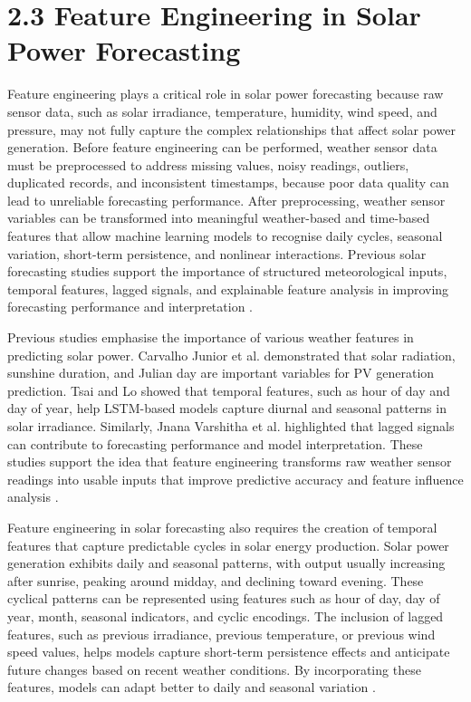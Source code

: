 \section{2.3 Feature Engineering in Solar Power Forecasting}

Feature engineering plays a critical role in solar power forecasting because raw sensor data, such as solar irradiance, temperature, humidity, wind speed, and pressure, may not fully capture the complex relationships that affect solar power generation. Before feature engineering can be performed, weather sensor data must be preprocessed to address missing values, noisy readings, outliers, duplicated records, and inconsistent timestamps, because poor data quality can lead to unreliable forecasting performance. After preprocessing, weather sensor variables can be transformed into meaningful weather-based and time-based features that allow machine learning models to recognise daily cycles, seasonal variation, short-term persistence, and nonlinear interactions. Previous solar forecasting studies support the importance of structured meteorological inputs, temporal features, lagged signals, and explainable feature analysis in improving forecasting performance and interpretation \parencite{TsaiLo2025, JnanaVarshitha2025, Duvuru2026}.

Previous studies emphasise the importance of various weather features in predicting solar power. Carvalho Junior et al. demonstrated that solar radiation, sunshine duration, and Julian day are important variables for PV generation prediction. Tsai and Lo showed that temporal features, such as hour of day and day of year, help LSTM-based models capture diurnal and seasonal patterns in solar irradiance. Similarly, Jnana Varshitha et al. highlighted that lagged signals can contribute to forecasting performance and model interpretation. These studies support the idea that feature engineering transforms raw weather sensor readings into usable inputs that improve predictive accuracy and feature influence analysis \parencite{CarvalhoJunior2025, TsaiLo2025, JnanaVarshitha2025}.

Feature engineering in solar forecasting also requires the creation of temporal features that capture predictable cycles in solar energy production. Solar power generation exhibits daily and seasonal patterns, with output usually increasing after sunrise, peaking around midday, and declining toward evening. These cyclical patterns can be represented using features such as hour of day, day of year, month, seasonal indicators, and cyclic encodings. The inclusion of lagged features, such as previous irradiance, previous temperature, or previous wind speed values, helps models capture short-term persistence effects and anticipate future changes based on recent weather conditions. By incorporating these features, models can adapt better to daily and seasonal variation \parencite{TsaiLo2025, JnanaVarshitha2025, Eren2025}.

